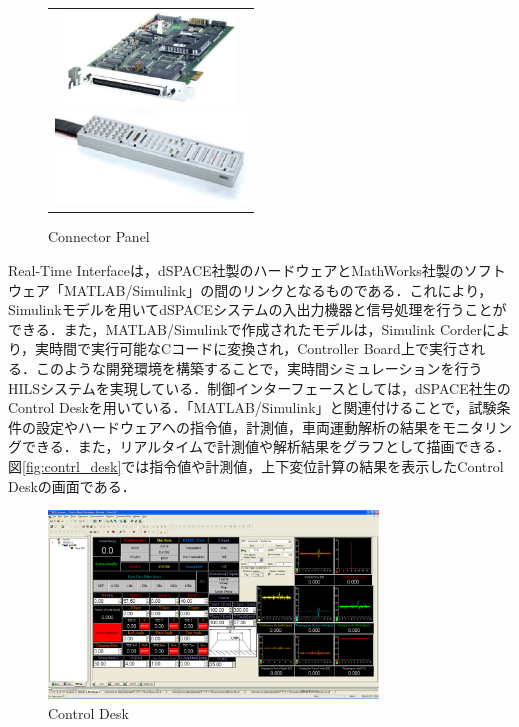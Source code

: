 \documentclass[a4paper,12pt]{article_vdlab_sotsuron}
\begin{document}
\vspace{10mm}
\begin{figure}[h]
    \begin{tabular}{c}
      \begin{minipage}{0.5\hsize}
	\begin{center}
	  \includegraphics[height=25mm]{figure/ds1104.eps}
	  \caption{Controller Borad\cite{dspace}}
	  \label{fig:ds1104}
	\end{center}
      \end{minipage}
      \begin{minipage}{0.5\hsize}
	\begin{center}
	  \includegraphics[height=25mm]{figure/conpane.eps}
	  \caption{Connector Panel\cite{dspace}}
	  \label{fig:conpane}
	\end{center}
      \end{minipage}
    \end{tabular}
\end{figure}

Real-Time Interfaceは，dSPACE社製のハードウェアとMathWorks社製のソフトウェア「MATLAB/Simulink」の間のリンクとなるものである．これにより，Simulinkモデルを用いてdSPACEシステムの入出力機器と信号処理を行うことができる．また，MATLAB/Simulinkで作成されたモデルは，Simulink Corderにより，実時間で実行可能なCコードに変換され，Controller Board上で実行される．このような開発環境を構築することで，実時間シミュレーションを行うHILSシステムを実現している．制御インターフェースとしては，dSPACE社生のControl Deskを用いている．「MATLAB/Simulink」と関連付けることで，試験条件の設定やハードウェアへの指令値，計測値，車両運動解析の結果をモニタリングできる．また，リアルタイムで計測値や解析結果をグラフとして描画できる．図\ref{fig:contrl_desk}では指令値や計測値，上下変位計算の結果を表示したControl Deskの画面である．

\vspace{10mm}
\begin{figure}[h]
 \centering
 \includegraphics[height=50mm]{figure/control_desk.eps}
 \vspace{2mm}
  \caption{Control Desk}
 \label{fig:control_desk}
\end{figure}
\end{document}
